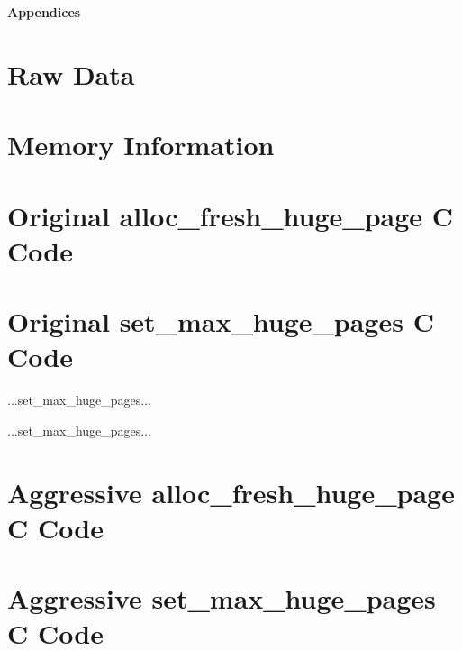 \documentclass{article}
\begin{document}
\begin{appendices}
	\newpage
	\textbf{Appendices}
	\section{Raw Data}
		
		\label{figure:Raw Hugepage Test Scenario Data}
	\section{Memory Information} 
		
		\label{figure:System Memory Information At Startup}
		\newpage
	\section{Original alloc\_fresh\_huge\_page C Code}
		
		\label{figure:Original alloc_fresh_huge_page}
	\section{Original set\_max\_huge\_pages C Code}
		...set\_max\_huge\_pages...
		
		\label{figure:Excerpt of Original set_max_huge_pages}
		...set\_max\_huge\_pages...
	\newpage
	\section{Aggressive alloc\_fresh\_huge\_page C Code}
		
		\label{figure:Aggressive alloc_fresh_huge_page}
	\newpage
	\section{Aggressive set\_max\_huge\_pages C Code}
		
		\label{figure:Aggressive alloc_fresh_huge_page}
\end{appendices}
\end{document}
